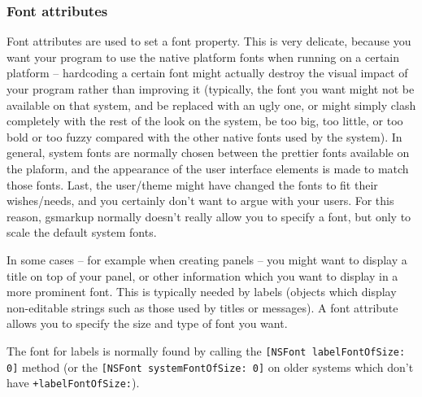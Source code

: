 \subsubsection{Font attributes}
Font attributes are used to set a font property.  This is very
delicate, because you want your program to use the native platform
fonts when running on a certain platform -- hardcoding a certain font
might actually destroy the visual impact of your program rather than
improving it (typically, the font you want might not be available on
that system, and be replaced with an ugly one, or might simply clash
completely with the rest of the look on the system, be too big, too
little, or too bold or too fuzzy compared with the other native fonts
used by the system).  In general, system fonts are normally chosen
between the prettier fonts available on the plaform, and the
appearance of the user interface elements is made to match those
fonts.  Last, the user/theme might have changed the fonts to fit their
wishes/needs, and you certainly don't want to argue with your users.
For this reason, gsmarkup normally doesn't really allow you to specify a
font, but only to scale the default system fonts.

In some cases -- for example when creating panels -- you might want to
display a title on top of your panel, or other information which you
want to display in a more prominent font.  This is typically needed by
labels (objects which display non-editable strings such as those used
by titles or messages).  A font attribute allows you to specify the
size and type of font you want.

The font for labels is normally found by calling the \texttt{[NSFont
labelFontOfSize: 0]} method (or the \texttt{[NSFont systemFontOfSize:
0]} on older systems which don't have \texttt{+labelFontOfSize:}).

